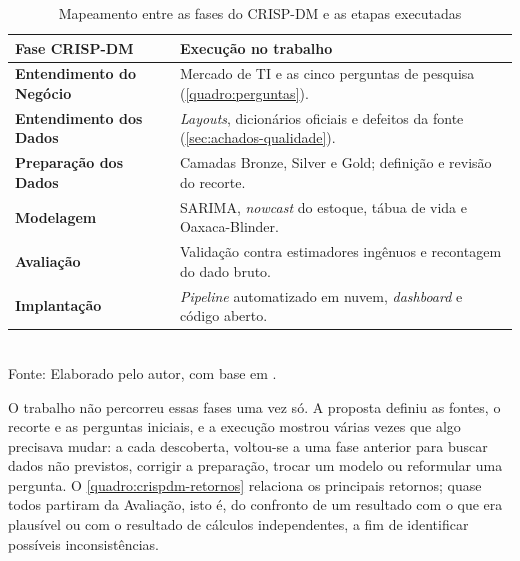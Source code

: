 \begin{table}[htbp]
    \centering
    \caption{Mapeamento entre as fases do CRISP-DM e as etapas executadas}
    \label{tab:crispdm-fases}
    \renewcommand{\arraystretch}{1.35}
    \begin{tabularx}{\textwidth}{>{\raggedright\arraybackslash}p{2.7cm}>{\raggedright\arraybackslash}X}
        \toprule
        \rowcolor{black!8}
        \textbf{Fase CRISP-DM} & \textbf{Execução no trabalho} \\
        \midrule
        \textbf{Entendimento do Negócio}  & Mercado de TI e as cinco perguntas de pesquisa (\autoref{quadro:perguntas}). \\
        \textbf{Entendimento dos Dados}   & \textit{Layouts}, dicionários oficiais e defeitos da fonte (\autoref{sec:achados-qualidade}). \\
        \textbf{Preparação dos Dados}     & Camadas Bronze, Silver e Gold; definição e revisão do recorte. \\
        \textbf{Modelagem}                & SARIMA, \textit{nowcast} do estoque, tábua de vida e Oaxaca-Blinder. \\
        \textbf{Avaliação}                & Validação contra estimadores ingênuos e recontagem do dado bruto. \\
        \textbf{Implantação}              & \textit{Pipeline} automatizado em nuvem, \textit{dashboard} e código aberto. \\
        \bottomrule
    \end{tabularx}
    \\[4pt]
    {\footnotesize Fonte: Elaborado pelo autor, com base em .}
\end{table}

O trabalho não percorreu essas fases uma vez só. A proposta definiu as fontes, o recorte e as perguntas iniciais, e a execução mostrou várias vezes que algo precisava mudar: a cada descoberta, voltou-se a uma fase anterior para buscar dados não previstos, corrigir a preparação, trocar um modelo ou reformular uma pergunta. O \autoref{quadro:crispdm-retornos} relaciona os principais retornos; quase todos partiram da Avaliação, isto é, do confronto de um resultado com o que era plausível ou com o resultado de cálculos independentes, a fim de identificar possíveis inconsistências.

